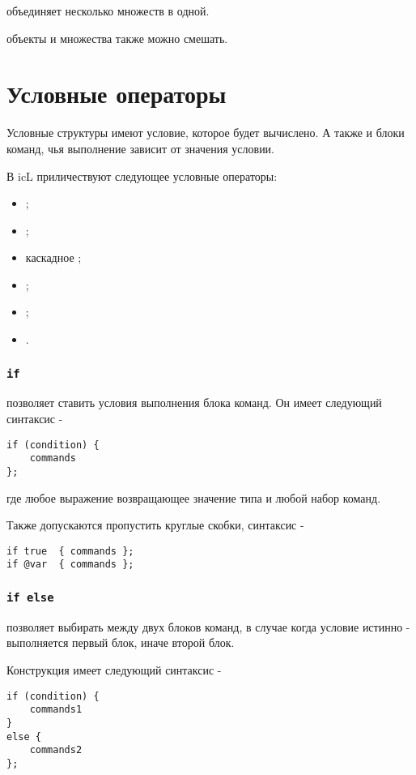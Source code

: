 \documentclass[a4paper, 14pt]{extarticle}
\newenvironment{icItems}
	{ \begin{itemize} [noitemsep,nolistsep] }
	{ \end{itemize} }
\begin{document}
 объединяет несколько множеств в одной.

 объекты и множества также можно смешать.

\section{Условные операторы}

Условные структуры имеют условие, которое будет вычислено. А также и блоки команд, чья выполнение зависит от значения условии.

В icL приличествуют следующее условные операторы:
\begin{icItems}
	\item {};
	\item {};
	\item каскадное ;
	\item {};
	\item {};
	\item {}.
\end{icItems}

\subsubsection{\lstinline`if`}

 позволяет ставить условия выполнения блока команд. Он имеет следующий синтаксис -
\begin{lstlisting}[numbers=none]
if (condition) {
	commands
};
\end{lstlisting}
где  любое выражение возвращающее значение типа \bool{} и  любой набор команд.

Также допускаются пропустить круглые скобки, синтаксис -
\begin{lstlisting}[numbers=none]
if true  { commands };
if @var  { commands };
\end{lstlisting}

\subsubsection{\lstinline`if else`}

 позволяет выбирать между двух блоков команд, в случае когда условие истинно - выполняется первый блок, иначе второй блок.

Конструкция  имеет следующий синтаксис -
\begin{lstlisting}[numbers=none]
if (condition) {
	commands1
}
else {
	commands2
};
\end{lstlisting}
\end{document}
